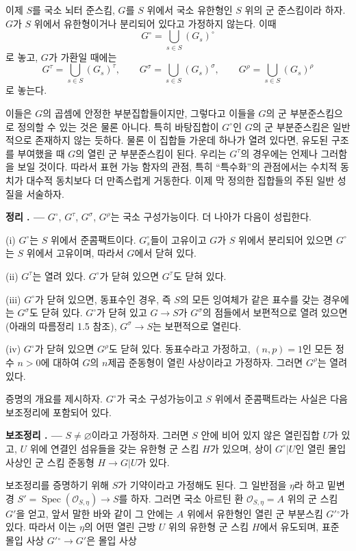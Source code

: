 \documentclass[11pt,twoside,openany]{book}
\numberwithin{equation}{section}
\newcommand{\sourceunit}{front}
\newcommand{\src}[1]{%
  \phantomsection\hypertarget{src:\sourceunit:#1}{}%
  \marginpar{\raggedleft\footnotesize\sffamily #1}%
}
\theoremstyle{plain}
\theoremstyle{definition}
\theoremstyle{remark}
\newcommand{\result}[2]{%
  \par\medskip\noindent\textbf{#1%
  \if\relax\detokenize{#2}\relax\else\space#2\fi. ---}\enspace
}
\begin{document}
이제 $S$를 국소 뇌터 준스킴, $G$를 $S$ 위에서 국소 유한형인 $S$ 위의
군 준스킴이라 하자. $G$가 $S$ 위에서 유한형이거나 분리되어 있다고
가정하지 않는다. 이때
\[
G^\circ=\bigcup_{s\in S}(G_s)^\circ
\]
로 놓고, $G$가 가환일 때에는
\[
G^\tau=\bigcup_{s\in S}(G_s)^\tau,
\qquad
G^\sigma=\bigcup_{s\in S}(G_s)^\sigma,
\qquad
G^\rho=\bigcup_{s\in S}(G_s)^\rho
\]
로 놓는다.

\src{224}
이들은 $G$의 곱셈에 안정한 부분집합들이지만, 그렇다고 이들을 $G$의 군
부분준스킴으로 정의할 수 있는 것은 물론 아니다. 특히 바탕집합이
$G^\circ$인 $G$의 군 부분준스킴은 일반적으로 존재하지 않는 듯하다.
물론 이 집합들 가운데 하나가 열려 있다면, 유도된 구조를 부여했을 때
$G$의 열린 군 부분준스킴이 된다. 우리는 $G^\tau$의 경우에는 언제나
그러함을 보일 것이다. 따라서 표현 가능 함자의 관점, 특히 ``특수화''의
관점에서는 수치적 동치가 대수적 동치보다 더 만족스럽게 거동한다. 이제
막 정의한 집합들의 주된 일반 성질을 서술하자.

\result{정리}{1.1} $G^\circ$, $G^\tau$, $G^\sigma$, $G^\rho$는 국소
구성가능이다. 더 나아가 다음이 성립한다.

\noindent (i) $G^\circ$는 $S$ 위에서 준콤팩트이다. $G_s^\circ$들이
고유이고 $G$가 $S$ 위에서 분리되어 있으면 $G^\circ$는 $S$ 위에서
고유이며, 따라서 $G$에서 닫혀 있다.

\noindent (ii) $G^\tau$는 열려 있다. $G^\circ$가 닫혀 있으면
$G^\tau$도 닫혀 있다.

\noindent (iii) $G^\circ$가 닫혀 있으면, 동표수인 경우, 즉 $S$의 모든
잉여체가 같은 표수를 갖는 경우에는 $G^\sigma$도 닫혀 있다.
$G^\circ$가 닫혀 있고 $G\longrightarrow S$가 $G^\sigma$의 점들에서
보편적으로 열려 있으면(아래의 따름정리 1.5 참조),
$G^\sigma\longrightarrow S$는 보편적으로 열린다.

\noindent (iv) $G^\circ$가 닫혀 있으면 $G^\rho$도 닫혀 있다.
동표수라고 가정하고, $(n,p)=1$인 모든 정수 $n>0$에 대하여 $G$의
$n$제곱 준동형이 열린 사상이라고 가정하자. 그러면 $G^\rho$는 열려 있다.

증명의 개요를 제시하자. $G^\circ$가 국소 구성가능이고 $S$ 위에서
준콤팩트라는 사실은 다음 보조정리에 포함되어 있다.

\result{보조정리}{1.2} $S\neq\varnothing$이라고 가정하자. 그러면
$S$ 안에 비어 있지 않은 열린집합 $U$가 있고, $U$ 위에 연결인 섬유들을
갖는 유한형 군 스킴 $H$가 있으며, 상이 $G^\circ|U$인 열린 몰입 사상인
군 스킴 준동형 $H\longrightarrow G|U$가 있다.

보조정리를 증명하기 위해 $S$가 기약이라고 가정해도 된다. 그 일반점을
$\eta$라 하고 밑변경
$S'=\operatorname{Spec}(\mathcal O_{S,\eta})\longrightarrow S$를 하자.
그러면 국소 아르틴 환 $\mathcal O_{S,\eta}=A$ 위의 군 스킴 $G'$을 얻고,
앞서 말한 바와 같이 그 안에는 $A$ 위에서 유한형인 열린 군 부분스킴
$G'{}^\circ$가 있다. 따라서 이는 $\eta$의 어떤 열린 근방 $U$ 위의
유한형 군 스킴 $H$에서 유도되며, 표준 몰입 사상
$G'{}^\circ\longrightarrow G'$은 몰입 사상
\end{document}
